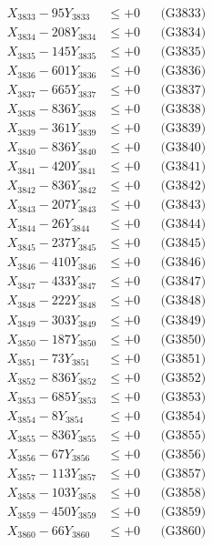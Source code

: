 \documentclass[a4paper,10pt]{article}
\begin{document}
{\begin{align}
X_{3833} - 95Y_{3833} &\leq +0 && \text{(G3833)} \\
X_{3834} - 208Y_{3834} &\leq +0 && \text{(G3834)} \\
X_{3835} - 145Y_{3835} &\leq +0 && \text{(G3835)} \\
X_{3836} - 601Y_{3836} &\leq +0 && \text{(G3836)} \\
X_{3837} - 665Y_{3837} &\leq +0 && \text{(G3837)} \\
X_{3838} - 836Y_{3838} &\leq +0 && \text{(G3838)} \\
X_{3839} - 361Y_{3839} &\leq +0 && \text{(G3839)} \\
X_{3840} - 836Y_{3840} &\leq +0 && \text{(G3840)} \\
\allowbreak
X_{3841} - 420Y_{3841} &\leq +0 && \text{(G3841)} \\
X_{3842} - 836Y_{3842} &\leq +0 && \text{(G3842)} \\
X_{3843} - 207Y_{3843} &\leq +0 && \text{(G3843)} \\
X_{3844} - 26Y_{3844} &\leq +0 && \text{(G3844)} \\
X_{3845} - 237Y_{3845} &\leq +0 && \text{(G3845)} \\
X_{3846} - 410Y_{3846} &\leq +0 && \text{(G3846)} \\
X_{3847} - 433Y_{3847} &\leq +0 && \text{(G3847)} \\
X_{3848} - 222Y_{3848} &\leq +0 && \text{(G3848)} \\
X_{3849} - 303Y_{3849} &\leq +0 && \text{(G3849)} \\
X_{3850} - 187Y_{3850} &\leq +0 && \text{(G3850)} \\
\allowbreak
X_{3851} - 73Y_{3851} &\leq +0 && \text{(G3851)} \\
X_{3852} - 836Y_{3852} &\leq +0 && \text{(G3852)} \\
X_{3853} - 685Y_{3853} &\leq +0 && \text{(G3853)} \\
X_{3854} - 8Y_{3854} &\leq +0 && \text{(G3854)} \\
X_{3855} - 836Y_{3855} &\leq +0 && \text{(G3855)} \\
X_{3856} - 67Y_{3856} &\leq +0 && \text{(G3856)} \\
X_{3857} - 113Y_{3857} &\leq +0 && \text{(G3857)} \\
X_{3858} - 103Y_{3858} &\leq +0 && \text{(G3858)} \\
X_{3859} - 450Y_{3859} &\leq +0 && \text{(G3859)} \\
X_{3860} - 66Y_{3860} &\leq +0 && \text{(G3860)} \\

\end{align}}
\end{document}
